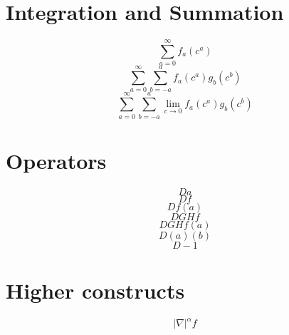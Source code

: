 \documentclass{article}
\begin{document}
\section{Integration and Summation}
\[ \sum_{a=0}^\infty f_a(c^a) \]
\[ \sum_{a=0}^\infty \sum_{b=-a}^a f_a(c^a) g_b(c^b) \]
\[ \sum_{a=0}^\infty \sum_{b=-a}^a \lim_{c\rightarrow 0} f_a(c^a) g_b(c^b) \]

\section{Operators}
\[  D a \]
\[  D f \]
\[  D f(a) \]
\[  D G H f \]
\[  D G H f (a) \]
\[  D (a) (b) \]
\[ D -1 \]

\section{Higher constructs}
\[ |\nabla|^{\alpha} f \]
\end{document}
